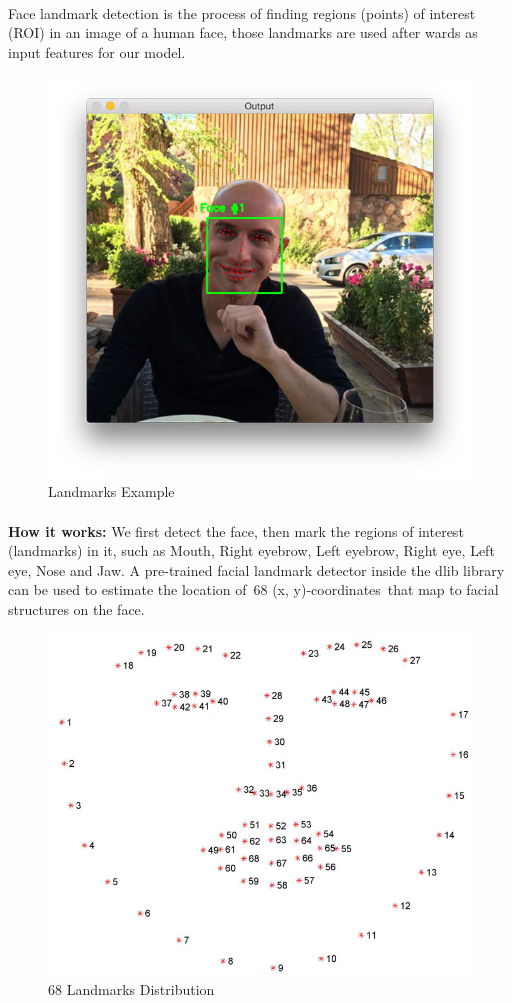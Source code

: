 \paragraph{}
Face landmark detection is the process of finding regions (points) of interest (ROI) in an image of a human face, those landmarks are used after wards as input features for our model.
\begin{figure}[H]
	\centering
	\includegraphics[width=.5\linewidth]{images/lm1.jpg}
	\caption{Landmarks Example}
\end{figure}
\paragraph{}
\textbf{How it works:}\newline
We first detect the face, then mark the regions of interest (landmarks) in it, such as Mouth, Right eyebrow, Left eyebrow, Right eye, Left eye, Nose and Jaw.\newline
A pre-trained facial landmark detector inside the dlib library can be used to estimate the location of 68 (x, y)-coordinates that map to facial structures on the face.

\begin{figure}[H]
	\centering
	\includegraphics[width=.5\linewidth]{images/lm2.jpg}
	\caption{68 Landmarks Distribution}
\end{figure}

